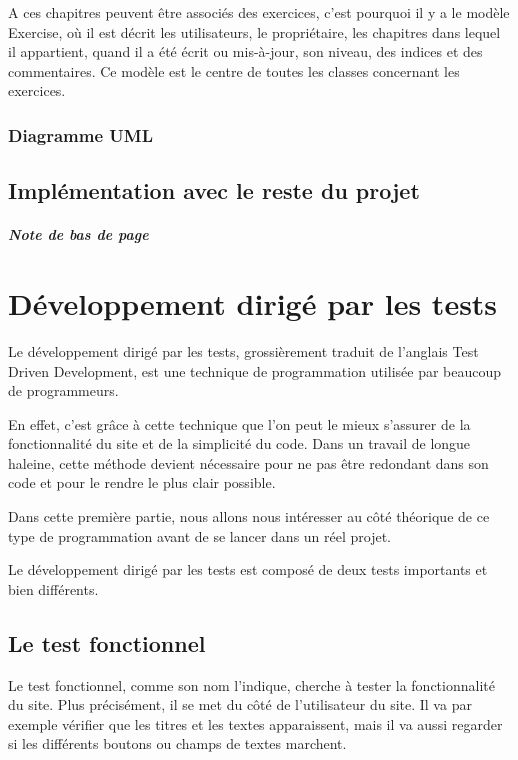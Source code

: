 \documentclass[letterpaper,10pt,french]{sphinxmanual}
\begin{document}
A ces chapitres peuvent être associés des exercices, c'est pourquoi il y a le
modèle Exercise, où il est décrit les utilisateurs, le propriétaire, les
chapitres dans lequel il appartient, quand il a été écrit ou mis-à-jour,
son niveau, des indices et des commentaires. Ce modèle est le centre de toutes
les classes concernant les exercices.


\subsection{Diagramme UML}
\label{documentation:diagramme-uml}

\section{Implémentation avec le reste du projet}
\label{documentation:implementation-avec-le-reste-du-projet}\paragraph{Note de bas de page}


\chapter{Développement dirigé par les tests}
\label{tdd::doc}\label{tdd:developpement-dirige-par-les-tests}
Le développement dirigé par les tests, grossièrement traduit de l'anglais Test
Driven Development, est une technique de programmation utilisée par beaucoup de
programmeurs.

En effet, c'est grâce à cette technique que l'on peut le mieux s'assurer de la
fonctionnalité du site et de la simplicité du code. Dans un travail de longue
haleine, cette méthode devient nécessaire pour ne pas être redondant dans son
code et pour le rendre le plus clair possible.

Dans cette première partie, nous allons nous intéresser au côté théorique de ce
type de programmation avant de se lancer dans un réel projet.

Le développement dirigé par les tests est composé de deux tests importants et
bien différents.


\section{Le test fonctionnel}
\label{tdd:le-test-fonctionnel}
Le test fonctionnel, comme son nom l'indique, cherche à tester la fonctionnalité
du site. Plus précisément, il se met du côté de l'utilisateur du site. Il va par
exemple vérifier que les titres et les textes apparaissent, mais il va aussi
regarder si les différents boutons ou champs de textes marchent.
\end{document}

